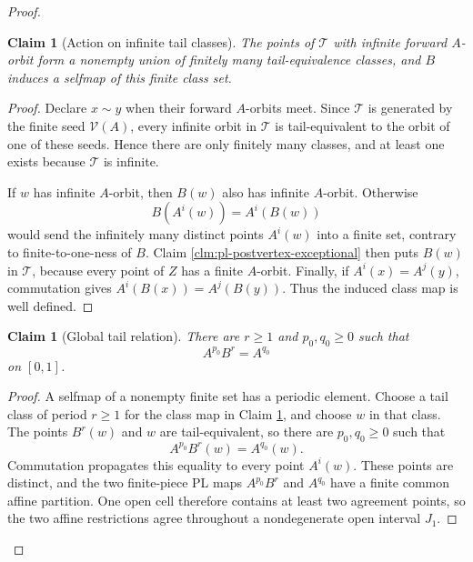 \documentclass[11pt]{article}
\newtheorem{claim}[theorem]{Claim}
\theoremstyle{definition}
\theoremstyle{remark}
\newcommand{\I}{[0,1]}
\begin{document}
\begin{proof}
\begin{claim}[Action on infinite tail classes]
\label{clm:pl-tail-class-action}
The points of \(\mathcal T\) with infinite forward \(A\)-orbit form a
nonempty union of finitely many tail-equivalence classes, and \(B\) induces
a selfmap of this finite class set.
\end{claim}

\begin{proof}
Declare \(x\sim y\) when their forward \(A\)-orbits meet.  Since
\(\mathcal T\) is generated by the finite seed \(\mathcal V(A)\), every
infinite orbit in \(\mathcal T\) is tail-equivalent to the orbit of one of
these seeds.  Hence there are only finitely many classes, and at least one
exists because \(\mathcal T\) is infinite.

If \(w\) has infinite \(A\)-orbit, then \(B(w)\) also has infinite
\(A\)-orbit.  Otherwise
\[
 B(A^i(w))=A^i(B(w))
\]
would send the infinitely many distinct points \(A^i(w)\) into a finite set,
contrary to finite-to-one-ness of \(B\).  Claim
\ref{clm:pl-postvertex-exceptional} then puts \(B(w)\) in \(\mathcal T\),
because every point of \(Z\) has a finite \(A\)-orbit.  Finally, if
\(A^i(x)=A^j(y)\), commutation gives
\(A^i(B(x))=A^j(B(y))\).  Thus the induced class map is well defined.
\end{proof}

\begin{claim}[Global tail relation]\label{clm:pl-tail-relation-global}
There are \(r\geq1\) and \(p_0,q_0\geq0\) such that
\begin{equation}\label{term:eq:global-tail-relation}
 A^{p_0}B^r=A^{q_0}
\end{equation}
on \(\I\).
\end{claim}

\begin{proof}
A selfmap of a nonempty finite set has a periodic element.  Choose a tail
class of period \(r\geq1\) for the class map in Claim
\ref{clm:pl-tail-class-action}, and choose \(w\) in that class.  The points
\(B^r(w)\) and \(w\) are tail-equivalent, so there are \(p_0,q_0\geq0\)
such that
\begin{equation}\label{term:eq:tail-relation}
 A^{p_0}B^r(w)=A^{q_0}(w).
\end{equation}
Commutation propagates this equality to every point \(A^i(w)\).  These
points are distinct, and the two finite-piece PL maps
\(A^{p_0}B^r\) and \(A^{q_0}\) have a finite common affine partition.
One open cell therefore contains at least two agreement points, so the two
affine restrictions agree throughout a nondegenerate open interval \(J_1\).


\end{proof}
\end{proof}
\end{document}
